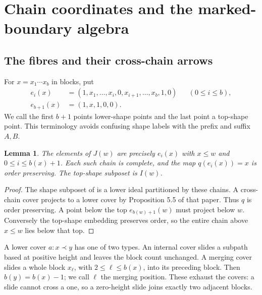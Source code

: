 \documentclass[11pt]{article}
\newtheorem{lemma}[theorem]{Lemma}
\theoremstyle{definition}
\begin{document}
\section{Chain coordinates and the marked-boundary algebra}
\label{sec:structure}
\subsection{The fibres and their cross-chain arrows}
For $x=x_1\cdots x_b$ in blocks, put
\begin{align*}
 e_i(x)&=(1,x_1,\ldots,x_i,0,x_{i+1},\ldots,x_b,1,0)
                       &&(0\leq i\leq b),\\
 e_{b+1}(x)&=(1,x,1,0,0).
\end{align*}
We call the first $b+1$ points lower-shape points and the last point
a top-shape point. This terminology avoids confusing shape labels
with the prefix and suffix $A,B$.

\begin{lemma}\label{lem:fibres}
The elements of $J(w)$ are precisely $e_i(x)$ with $x\leq w$ and
$0\leq i\leq b(x)+1$. Each such chain is complete, and the map
$q(e_i(x))=x$ is order preserving. The top-shape subposet is $I(w)$.
\end{lemma}
\begin{proof}
The shape subposet of \cite[Lemmas 5.3--5.4]{Chapoton} is a lower
ideal partitioned by these chains. A cross-chain cover projects to a
lower cover by Proposition 5.5 of that paper. Thus $q$ is order
preserving. A point below the top $e_{b(w)+1}(w)$ must project below
$w$. Conversely the top-shape embedding preserves order, so the
entire chain above $x\leq w$ lies below that top.
\end{proof}

A lower cover $a:x\prec y$ has one of two types. An internal cover
slides a subpath based at positive height and leaves the block count
unchanged. A merging cover slides a whole block $x_\ell$, with
$2\leq\ell\leq b(x)$, into its preceding block. Then $b(y)=b(x)-1$;
we call $\ell$ the merging position. These exhaust the covers:
a slide cannot cross a one, so a zero-height slide joins exactly two
adjacent blocks.
\end{document}
